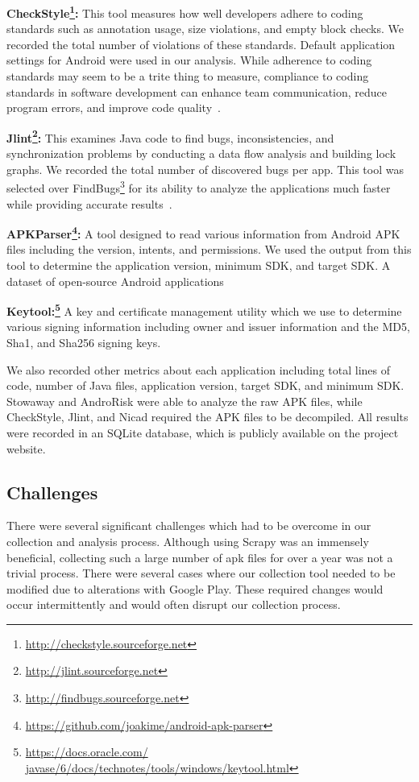 \documentclass{sig-alternate-05-2015}
\begin{document}
 \textbf{CheckStyle\footnote{\url{http://checkstyle.sourceforge.net}}:} This tool measures how well developers adhere to coding standards such as annotation usage, size violations, and empty block checks. We recorded the total number of violations of these standards. Default application settings for Android were used in our analysis. While adherence to coding standards may seem to be a trite thing to measure, compliance to coding standards in software development can enhance team communication, reduce program errors, and improve code quality~\cite{Li:2005:ETC:1095714.1095770}.

 \textbf{Jlint\footnote{\url{http://jlint.sourceforge.net}}:} This examines Java code to find bugs, inconsistencies, and synchronization problems by conducting a data flow analysis and building lock graphs. We recorded the total number of discovered bugs per app. This tool was selected over FindBugs\footnote{\url{http://findbugs.sourceforge.net}} for its ability  to analyze the applications much faster while providing accurate results~\cite{rutar2004comparison}.

 \textbf{APKParser\footnote{\url{https://github.com/joakime/android-apk-parser}}:} A tool designed to read various information from Android APK files including the version, intents, and permissions. We used the output from this tool to determine the application version, minimum SDK, and target SDK.
A dataset of open-source Android applications

\textbf{Keytool:\footnote{\url{https://docs.oracle.com/ javase/6/docs/technotes/tools/windows/keytool.html}}} A key and certificate management utility which we use to determine various signing information including owner and issuer information and the MD5, Sha1, and Sha256 signing keys.

We also recorded other metrics about each application including total lines of code, number of Java files, application version, target SDK, and minimum SDK. Stowaway and AndroRisk were able to analyze the raw APK files, while CheckStyle, Jlint, and Nicad required the APK files to be decompiled. All results were recorded in an SQLite database, which is publicly available on the project website.


\subsection{Challenges}

There were several significant challenges which had to be overcome in our collection and analysis process. Although using Scrapy was an immensely beneficial, collecting such a large number of apk files for over a year was not a trivial process. There were several cases where our collection tool needed to be modified due to alterations with Google Play. These required changes would occur intermittently and would often disrupt our collection process.
\end{document}

